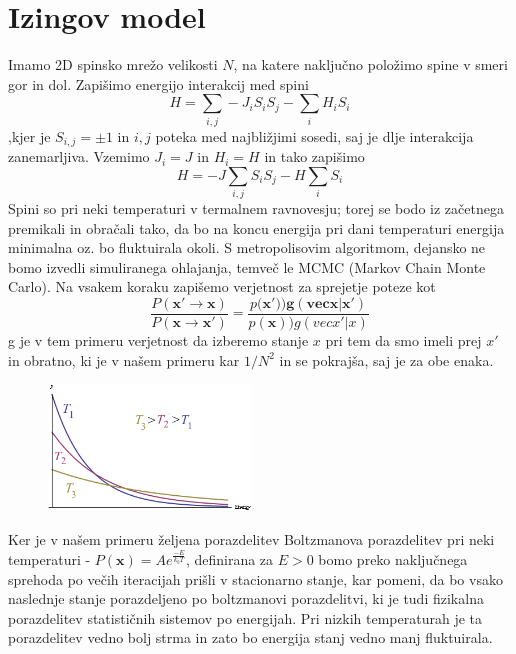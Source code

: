\documentclass[11pt, a4paper]{article}
\renewcommand{\vec}[1]{\mathbf{#1}}
\begin{document}
\section{Izingov model}
Imamo 2D spinsko mrežo velikosti $N$, na katere naključno položimo spine v smeri gor in dol. Zapišimo energijo interakcij med spini
\begin{equation}
H = \sum_{i,j} -J_i S_i S_j - \sum_i H_i S_i 
\end{equation}
,kjer je $S_{i,j} = \pm 1$ in $i,j$ poteka med najbližjimi sosedi, saj je dlje interakcija zanemarljiva. Vzemimo $J_i = J$ in $H_i = H$ in tako zapišimo 
\begin{equation}
H =-J \sum_{i,j}  S_i S_j -H \sum_i  S_i 
\end{equation}
Spini so pri neki temperaturi v termalnem ravnovesju; torej se bodo iz začetnega premikali in obračali tako, da bo na koncu energija pri dani temperaturi energija minimalna oz. bo fluktuirala okoli.
\newline\newline
S metropolisovim algoritmom, dejansko ne bomo izvedli simuliranega ohlajanja, temveč le MCMC (Markov Chain Monte Carlo). Na vsakem koraku zapišemo verjetnost za sprejetje poteze kot 
\begin{equation}
 \frac{P(\vec{x'} \rightarrow \vec{x})} {P(\vec{x} \rightarrow \vec{x'})} = \frac{p(\vec{x')) g(vec{x}|x')}}{p(\vec{x})) g(vec{x'}|x)}
\end{equation}
g je v tem primeru verjetnost da izberemo stanje $x$ pri tem da smo imeli prej $x'$ in obratno, ki je v našem primeru kar $1 / N^2$ in se pokrajša, saj je za obe enaka. \newline\newline
\begin{figure}
  \begin{center}
    \includegraphics[width=0.48\textwidth]{Boltzmann.png}
  \end{center}
  \caption{}

\end{figure}
\newline\newline
Ker je v našem primeru željena porazdelitev Boltzmanova porazdelitev pri neki temperaturi - $P(\vec{x}) = Ae^{\frac{-E}{k_bT}}$, definirana za $E>0$ bomo preko naključnega sprehoda po večih iteracijah prišli v stacionarno stanje, kar pomeni, da bo vsako naslednje stanje porazdeljeno po boltzmanovi porazdelitvi, ki je tudi fizikalna porazdelitev statističnih sistemov po energijah. Pri nizkih temperaturah je ta porazdelitev vedno bolj strma in zato bo energija stanj vedno manj fluktuirala.
\newline\newline
\end{document}
